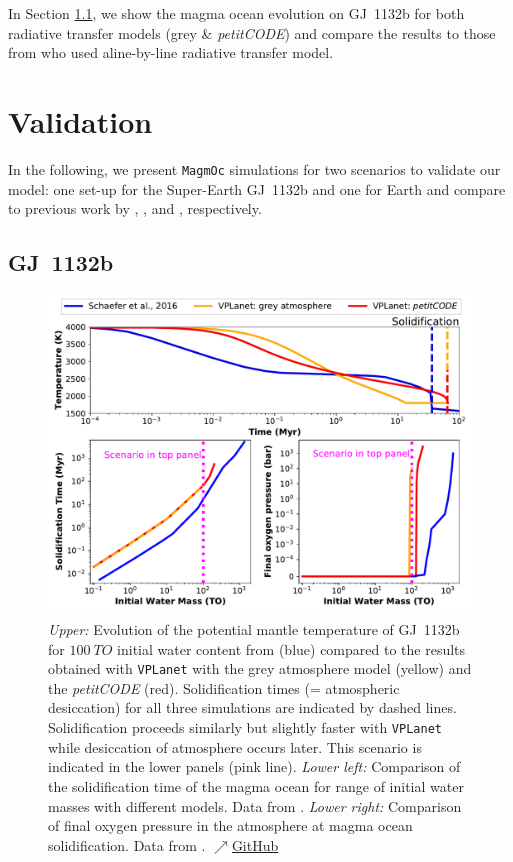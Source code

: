 \documentclass[paper=letterpaper,fontsize=12pt,oneside,twocolumn]{article}
\newcommand{\vplanet}{\texttt{\footnotesize{VPLanet}}}
\newcommand{\magmoc}{\texttt{\footnotesize{MagmOc}}}
\newcommand{\petit}{\textit{petitCODE}}
\begin{document}
In Section \ref{sec_res_GJ}, we show the magma ocean evolution on GJ~1132b for both radiative transfer models (grey \& \petit{}) and compare the results to those from \citet{Schaefer2016} who used aline-by-line radiative transfer model.

\section{Validation}
\label{chap_validation}
In the following, we present \magmoc{} simulations for two scenarios to validate our model: one set-up for the Super-Earth GJ~1132b and one for Earth and compare to previous work by \citet{Schaefer2016}, \citet{Elkins-Tanton2008}, and \citet{Hamano2013}, respectively.

\subsection{GJ~1132b}
\label{sec_res_GJ}

\begin{figure}[h]
    \centering
    \includegraphics[width=\textwidth]{BarthFig2.pdf}
    \caption{\textit{Upper:} Evolution of the potential mantle temperature of GJ~1132b for $\SI{100}{TO}$ initial water content from \citet[Fig. 4]{Schaefer2016} (blue) compared to the results obtained with \vplanet{} with the grey atmosphere model (yellow) and the \petit{} (red). Solidification times (= atmospheric desiccation) for all three simulations are indicated by dashed lines. Solidification proceeds similarly but slightly faster with \vplanet{} while desiccation of atmosphere occurs later. This scenario is indicated in the lower panels (pink line). \textit{Lower left:} Comparison of the solidification time of the magma ocean for range of initial water masses with different models. Data from \citet[Fig. 5]{Schaefer2016}. \textit{Lower right:} Comparison of final oxygen pressure in the atmosphere at magma ocean solidification. Data from \citet[Fig. 7]{Schaefer2016}.
    \href{https://github.com/pbfeu/Trappist1_MagmOc/tree/public/Fig_Temp_GJ1132b}{$\nearrow$GitHub}
    }
    \label{GJ1132b_VPLanet_Schaefer}
\end{figure}
\end{document}
